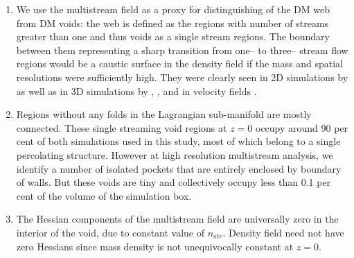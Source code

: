 \documentclass[fleqn,usenatbib,useAMS]{mnras}
\begin{document}
\begin{enumerate}

\item We use the multistream field as a proxy for distinguishing of the DM web from DM voids: the web is defined as the regions
with number of streams greater than one and thus voids  as  a single stream regions. The boundary between them  
representing a sharp transition from one-- to three-- stream flow regions
would be a caustic surface in the density field if the mass and spatial resolutions were sufficiently high. They were clearly seen in 
2D simulations by \cite{Melott1989} as well as in 3D simulations by \cite{Angulo2016}, \cite{Hahn2016a}, \cite{Hahn2013} and in velocity fields \cite{Hahn2015a}.

\item Regions without any folds in the Lagrangian sub-manifold are mostly connected. These single streaming void regions at $z=0$ occupy around 90 per cent of both simulations used in this study, most of which belong to a single percolating structure. However at high resolution multistream analysis, we identify a number of isolated pockets that are entirely enclosed by boundary of walls. But these voids are tiny and collectively occupy less than 0.1 per cent of the volume of the simulation box.

\item The Hessian components of the multistream field are universally zero in the interior of the void, due to constant value of $n_{str}$. Density field need not have zero Hessians since mass density is not unequivocally constant at $z=0$. 

\end{enumerate}
\end{document}
